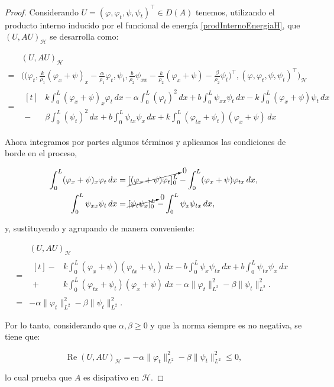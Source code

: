 \begin{proof}
    Considerando $U = (\varphi, \varphi_t, \psi, \psi_t)^\top \in D(A)$ tenemos, utilizando el producto interno inducido por el funcional de energía \eqref{prodInternoEnergiaH}, que $(U, AU)_{\mathcal{H}}$ se desarrolla como:

    \begin{align*}
        &(U, AU)_{\mathcal{H}}\\
        = &\Bigg(\bigg(\varphi_t, \frac{k}{\rho_1}(\varphi_{x} + \psi)_x - \frac{\alpha}{\rho_1}\varphi_t, \psi_t, \frac{b}{\rho_2}\psi_{xx} -\frac{k}{\rho_2}(\varphi_x + \psi) - \frac{\beta}{\rho_2}\psi_t \bigg)^\top,  (\varphi, \varphi_t, \psi, \psi_t)^\top\Bigg)_{\mathcal{H}}\\
        =&\begin{aligned}[t]
             &k\int_0^L(\varphi_x + \psi)_x \varphi_t \, dx - \alpha\int_0^L(\varphi_t)^2 \, dx  + b\int_0^L\psi_{xx}\psi_t \, dx - k\int_0^L(\varphi_x + \psi)\psi_t \, dx\\
            -& \beta\int_0^L(\psi_t)^2 \, dx + b\int_0^L \psi_{tx} \psi_x \, dx + k \int_0^L (\varphi_{tx} + \psi_t)(\varphi_x + \psi) \, dx
        \end{aligned}
    \end{align*}

    Ahora integramos por partes algunos términos y aplicamos las condiciones de borde en el proceso,

    \begin{align*}
        \int_0^L(\varphi_x + \psi)_x \varphi_t \, dx &= \cancelto{0}{[(\varphi_x + \psi)\varphi_t]_0^L} - \int_0^L(\varphi_x + \psi)\varphi_{tx} \, dx,\\
        \int_0^L\psi_{xx}\psi_t \, dx &= \cancelto{0}{[\psi_t\psi_x]_0^L} - \int_0^L \psi_x \psi_{tx} \, dx,
    \end{align*}

    y, sustituyendo y agrupando de manera conveniente:

    \begin{align*}
        &(U, AU)_{\mathcal{H}}\\
        =&\begin{aligned}[t]
            -&k\int_0^L(\varphi_x + \psi) (\varphi_{tx} + \psi_t) \, dx -b\int_0^L\psi_x \psi_{tx} \, dx + b\int_0^L \psi_{tx} \psi_x \, dx\\
            +& k \int_0^L (\varphi_{tx} + \psi_t)(\varphi_x + \psi) \, dx -\alpha\lVert\varphi_t\rVert^2_{L^2} - \beta\lVert\psi_t\rVert^2_{L^2}.
        \end{aligned}\\
        =& -\alpha\lVert\varphi_t\rVert^2_{L^2} - \beta\lVert\psi_t\rVert^2_{L^2}.
    \end{align*}

    Por lo tanto, considerando que $\alpha,\beta \geq 0$ y que la norma siempre es no negativa, se tiene que:

    \[\operatorname{Re}(U,AU)_{\mathcal{H}} = -\alpha\lVert\varphi_t\rVert^2_{L^2} - \beta\lVert\psi_t\rVert^2_{L^2} \leq 0,\]

    lo cual prueba que $A$ es disipativo en $\mathcal{H}$.
\end{proof}


